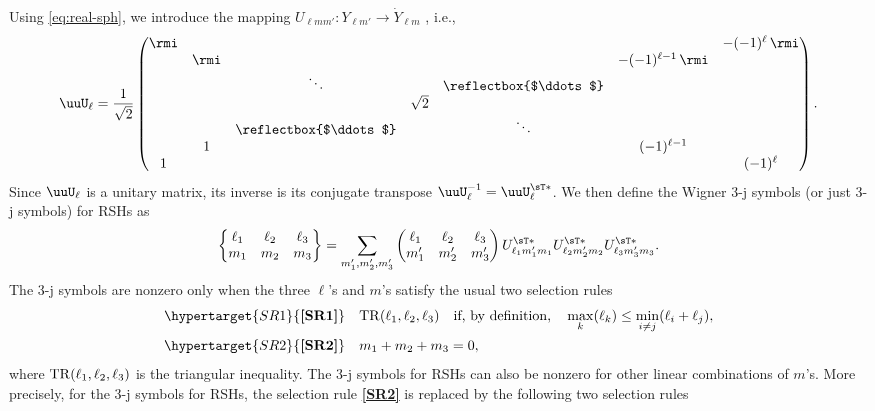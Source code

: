 Using \eqref{eq:real-sph}, we introduce the mapping $U_{\ell mm'} : Y_{\ell m'} \rightarrow \dot Y_{\ell m}$ \citep{blanco_evaluation_1997}, i.e.,
\begin{equation}\label{eq:U_l}
    \uuU_\ell =
    \frac{1}{\sqrt{2}}
    \begin{pmatrix}
        \rmi &&&&&& -(-1)^\ell\,\rmi \\
        & \rmi &&&& -(-1)^{\ell-1}\,\rmi & \\
        && \ddots && \reflectbox{$\ddots$} && \\
        &&& \sqrt{2} &&& \\
        && \reflectbox{$\ddots$} && \ddots && \\
        & 1 &&&& (-1)^{\ell-1} & \\
        1 &&&&&& (-1)^\ell
    \end{pmatrix}.
\end{equation}
Since $\uuU_\ell$ is a unitary matrix, its inverse is its conjugate transpose $\uuU_\ell^{-1} = \uuU_\ell^{\sT\ast}$.
We then define the Wigner 3-j symbols (or just 3-j symbols) for RSHs as
\begin{equation}\label{eq:3-j-symbol-real-sph}
    \begin{Bmatrix}
        \ell_1 & \ell_2 & \ell_3 \\ m_1 & m_2 & m_3
    \end{Bmatrix}
    =
    \sum_{m_1',m_2',m_3'}
    \begin{pmatrix}
        \ell_1 & \ell_2 & \ell_3 \\ m_1' & m_2' & m_3'
    \end{pmatrix}
    U^{\sT\ast}_{\ell_1 m'_1m_1} U^{\sT\ast}_{\ell_2 m_2'm_2} U^{\sT\ast}_{\ell_3 m_3'm_3}.
\end{equation}
The 3-j symbols are nonzero only when the three $\ell$'s and $m$'s satisfy the usual two selection rules
\begin{align}
    \label{eq:triangular-inequality}
    \hypertarget{SR1}{\textbf{[SR1]}} & \quad {\rm TR}(\ell_1,\ell_2,\ell_3) \quad\text{if, by definition,}\quad \max_k(\ell_k) \leq \min_{i\ne j} (\ell_i+ \ell_j), \\
    \hypertarget{SR2}{\textbf{[SR2]}} & \quad m_1 + m_2 + m_3 = 0,
\end{align}
where ${\rm TR}(\ell_1,\ell_2,\ell_3)$ is the triangular inequality.
The 3-j symbols for RSHs can also be nonzero for other linear combinations of $m$'s.
More precisely, for the 3-j symbols for RSHs, the selection rule \hyperlink{SR2}{\textbf{[SR2]}} is replaced by the following two selection rules
